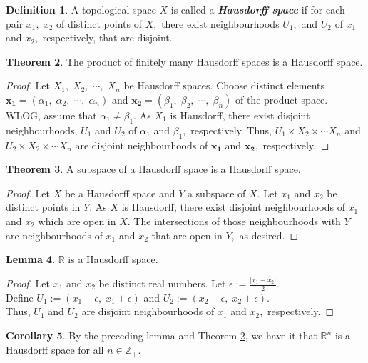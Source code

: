 \documentclass{article}
\theoremstyle{definition}
\newtheorem{theorem}{Theorem}[section]
\newtheorem{lem}[theorem]{Lemma}
\newtheorem{cor}[theorem]{Corollary}
\newtheorem{defn}[theorem]{Definition}
\begin{document}
%
\begin{defn} 
  A topological space $X$ is called a \textbf{\emph{Hausdorff space}} if for each pair $x_1,\; x_2$ of distinct points of $X,$ there exist neighbourhoods $U_1,$ and $U_2$ of $x_1$ and $x_2,$ respectively, that are disjoint. 
\end{defn}
%
\begin{theorem} \label{thm:product of Hausdorff spaces}
  The product of finitely many Hausdorff spaces is a Hausdorff space.
\end{theorem}
\begin{proof}
  Let $X_1,\;X_2,\;\cdots,\;X_n$ be Hausdorff spaces. Choose distinct elements $\mathbf{x_1} = (\alpha_1,\;\alpha_2,\;\cdots,\;\alpha_n)$ and $\mathbf{x_2} = (\beta_1,\;\beta_2,\;\cdots,\;\beta_n)$ of the product space. WLOG, assume that $\alpha_1 \neq \beta_1.$ As $X_1$ is Hausdorff, there exist disjoint neighbourhoods, $U_1$ and $U_2$ of $\alpha_1$ and $\beta_1,$ respectively. Thus, $U_1 \times X_2 \times \cdots X_n$ and $U_2 \times X_2 \times \cdots X_n$ are disjoint neighbourhoods of $\mathbf{x_1}$ and $\mathbf{x_2},$ respectively.
\end{proof}
%
\begin{theorem} 
  A subspace of a Hausdorff space is a Hausdorff space.
\end{theorem}
\begin{proof}
  Let $X$ be a Hausdorff space and $Y$ a subspace of $X.$ Let $x_1$ and $x_2$ be distinct points in $Y.$ As $X$ is Hausdorff, there exist disjoint neighbourhoods of $x_1$ and $x_2$ which are open in $X.$ The intersections of those neighbourhoods with $Y$ are neighbourhoods of $x_1$ and $x_2$ that are open in $Y,$ as desired.
\end{proof}
%
\begin{lem}
  $\mathbb{R}$ is a Hausdorff space.
\end{lem}
\begin{proof}
  Let $x_1$ and $x_2$ be distinct real numbers. Let $\epsilon := \frac{|x_1 - x_2|}{2}.$\\
  Define $U_1 := (x_1 - \epsilon,\; x_1 + \epsilon)$ and $U_2:= (x_2 - \epsilon,\; x_2 + \epsilon).$\\
  Thus, $U_1$ and $U_2$ are disjoint neighbourhoods of $x_1$ and $x_2,$ respectively.
\end{proof}
\begin{cor}
  By the preceding lemma and Theorem \ref{thm:product of Hausdorff spaces}, we have it that $\mathbb{R}^n$ is a Hausdorff space for all $n \in \mathbb{Z}_+.$
\end{cor}
\end{document}
